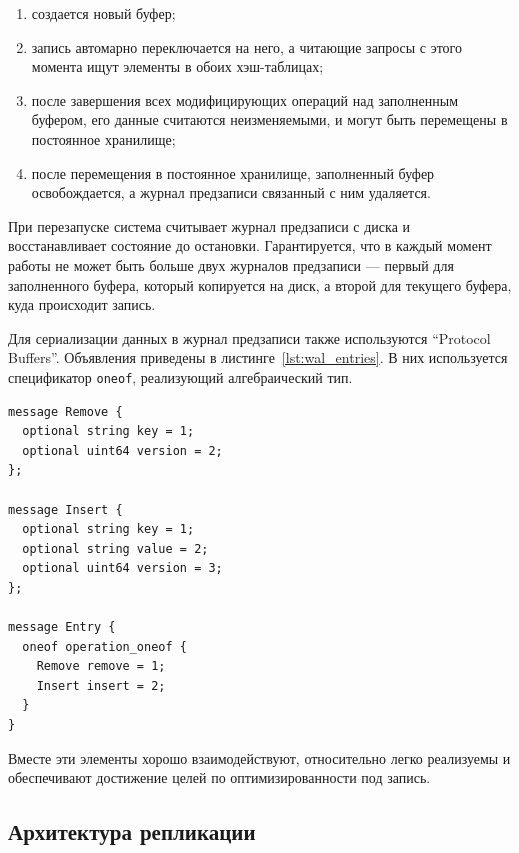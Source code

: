 \documentclass[14pt, russian]{scrartcl}
\begin{document}
\begin{enumerate}
  \item создается новый буфер;
  \item запись автомарно переключается на него, а читающие запросы с этого
        момента ищут элементы в обоих хэш-таблицах;
  \item после завершения всех модифицирующих операций над заполненным буфером,
        его данные считаются неизменяемыми, и могут быть перемещены в постоянное
        хранилище;
  \item после перемещения в постоянное хранилище, заполненный буфер
        освобождается, а журнал предзаписи связанный с ним удаляется.
\end{enumerate}

При перезапуске система считывает журнал предзаписи с диска и восстанавливает
состояние до остановки. Гарантируется, что в каждый момент работы не может быть
больше двух журналов предзаписи --- первый для заполненного буфера, который
копируется на диск, а второй для текущего буфера, куда происходит запись.

Для сериализации данных в журнал предзаписи также используются ``Protocol
Buffers''. Объявления приведены в листинге~\ref{lst:wal_entries}. В них
используется спецификатор \verb|oneof|, реализующий алгебраический тип.

\begin{listing}
  \caption{Объявление структуры записи в журнале предзаписи.}
  \label{lst:wal_entries}
  \begin{verbatim}
message Remove {
  optional string key = 1;
  optional uint64 version = 2;
};

message Insert {
  optional string key = 1;
  optional string value = 2;
  optional uint64 version = 3;
};

message Entry {
  oneof operation_oneof {
    Remove remove = 1;
    Insert insert = 2;
  }
}
  \end{verbatim}
\end{listing}

Вместе эти элементы хорошо взаимодействуют, относительно легко реализуемы и
обеспечивают достижение целей по оптимизированности под запись.

\subsection{Архитектура репликации}
\end{document}
